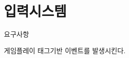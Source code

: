 \chapter{입력시스템}
\hypertarget{_xEC_x9E_x85_xEB_xA0_xA5_xEC_x8B_x9C_xEC_x8A_xA4_xED_x85_x9C}{}\label{_xEC_x9E_x85_xEB_xA0_xA5_xEC_x8B_x9C_xEC_x8A_xA4_xED_x85_x9C}
요구사항
\begin{DoxyItemize}
\item 게임플레이 태그기반 이벤트를 발생시킨다. 
\end{DoxyItemize}